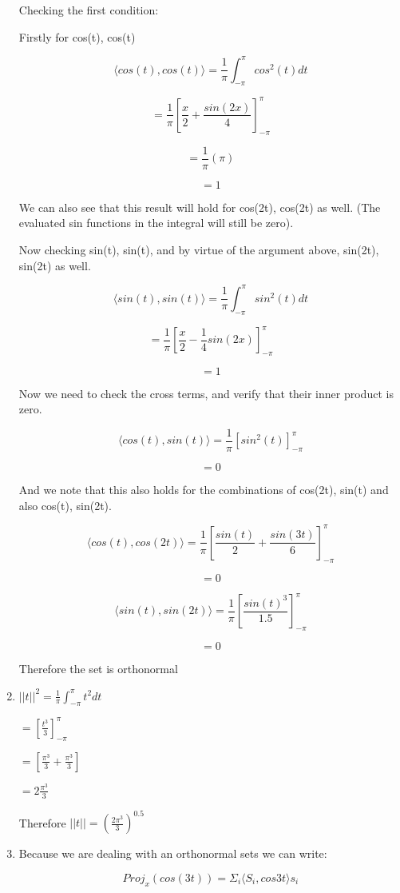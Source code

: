 \documentclass[letterpaper,12pt]{article}
\theoremstyle{definition}
\begin{document}
\begin{spacing}{1.3}{}
\begin{enumerate}
	Checking the first condition:
	
	Firstly for cos(t), cos(t)
	
	$$\langle cos(t), cos(t) \rangle = \frac{1}{\pi}\int_{-\pi}^{\pi} cos^{2}(t) dt$$
	
	$$= \frac{1}{\pi}[\frac{x}{2} + \frac{sin(2x)}{4}]_{-\pi}^{\pi}$$
	
	$$= \frac{1}{\pi}(\pi)$$
	
	$$=1$$
	
	We can also see that this result will hold for cos(2t), cos(2t) as well. (The evaluated sin functions in the integral will still be zero).
	
	Now checking sin(t), sin(t), and by virtue of the argument above, sin(2t), sin(2t) as well.
	
	$$\langle sin(t), sin(t) \rangle = \frac{1}{\pi}\int_{-\pi}^{\pi} sin^{2}(t) dt$$
	
	$$= \frac{1}{\pi}[\frac{x}{2} - \frac{1}{4}sin(2x)]_{-\pi}^{\pi}$$
	
	$$=1$$
	
	Now we need to check the cross terms, and verify that their inner product is zero.
	
	$$\langle cos(t), sin(t) \rangle = \frac{1}{\pi}[sin^2(t)]_{-\pi}^{\pi}$$
	
	$$=0$$
	
	And we note that this also holds for the combinations of cos(2t), sin(t) and also cos(t), sin(2t).
	
	$$\langle cos(t), cos(2t) \rangle = \frac{1}{\pi}[\frac{sin(t)}{2} + \frac{sin(3t)}{6}]_{-\pi}^{\pi}$$
	
	$$=0$$
	
	$$\langle sin(t), sin(2t) \rangle = \frac{1}{\pi}[\frac{sin(t)^3}{1.5}]_{-\pi}^{\pi}$$
	
	$$=0$$
	
	Therefore the set is orthonormal
  \item 
  $||t||^2 = \frac{1}{\pi}\int_{-\pi}^{\pi}t^2 dt$
	
	$= [\frac{t^3}{3}]_{-\pi}^{\pi}$
	
	$= [\frac{\pi^3}{3} + \frac{\pi^3}{3}]$
	
	$= 2\frac{\pi^3}{3}$
	
	Therefore $||t|| = (\frac{2\pi^3}{3})^{0.5}$
	
  \item
  Because we are dealing with an orthonormal sets we can write:
	
	$$Proj_{x}(cos(3t)) = \Sigma_{i}\langle S_i , cos{3t} \rangle s_i$$
	

\end{enumerate}
\end{spacing}
\end{document}
